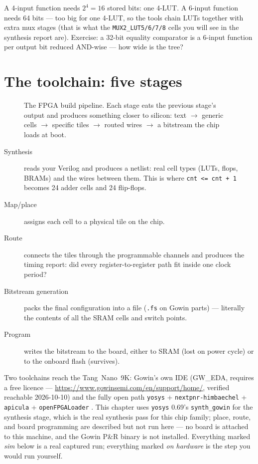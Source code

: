 \begin{example}
A 4-input function needs $2^4=16$ stored bits: one 4-LUT. A 6-input function
needs 64 bits --- too big for one 4-LUT, so the tools chain LUTs together with
extra mux stages (that is what the \texttt{MUX2\_LUT5/6/7/8} cells you will see
in the synthesis report are). Exercise: a 32-bit equality comparator is a
6-input function per output bit reduced AND-wise --- how wide is the tree?
\end{example}

\section{The toolchain: five stages}

\begin{figure}[htbp]\centering

\caption{The FPGA build pipeline. Each stage eats the previous stage's output
and produces something closer to silicon: text $\to$ generic cells $\to$
specific tiles $\to$ routed wires $\to$ a bitstream the chip loads at boot.}
\label{fig:flow13}
\end{figure}

\begin{description}
\item[Synthesis] reads your Verilog and produces a netlist: real cell types
(LUTs, flops, BRAMs) and the wires between them. This is where
\texttt{cnt <= cnt + 1} becomes 24 adder cells and 24 flip-flops.
\item[Map/place] assigns each cell to a physical tile on the chip.
\item[Route] connects the tiles through the programmable channels and produces
the timing report: did every register-to-register path fit inside one clock
period?
\item[Bitstream generation] packs the final configuration into a file
(\texttt{.fs} on Gowin parts) --- literally the contents of all the SRAM cells
and switch points.
\item[Program] writes the bitstream to the board, either to SRAM (lost on power
cycle) or to the onboard flash (survives).
\end{description}

Two toolchains reach the Tang~Nano~9K: Gowin's own IDE (GW\_EDA, requires a
free licence --- \url{https://www.gowinsemi.com/en/support/home/}, verified reachable 2026-10-10) and the
fully open path \texttt{yosys} + \texttt{nextpnr-himbaechel} + \texttt{apicula}
+ \texttt{openFPGALoader} \cite{apicula}. This chapter uses \texttt{yosys}
0.69's \texttt{synth\_gowin} for the synthesis stage, which is the real
synthesis pass for this chip family; place, route, and board programming are
described but not run here --- no board is attached to this machine, and the
Gowin P\&R binary is not installed. Everything marked \emph{sim} below is a
real captured run; everything marked \emph{on hardware} is the step you would
run yourself.

